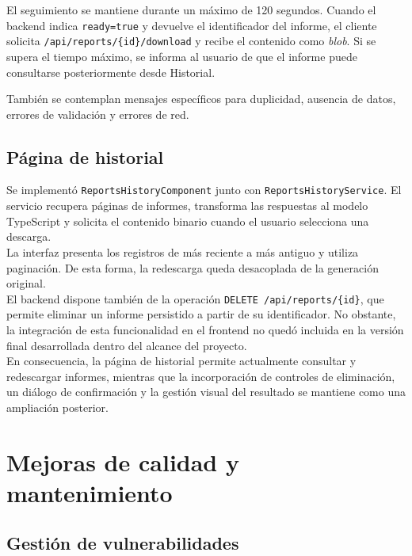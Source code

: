 \documentclass[11pt,a4paper,titlepage,oneside]{report}
\begin{document}
El seguimiento se mantiene durante un máximo de 120 segundos. Cuando el backend
indica \texttt{ready=true} y devuelve el identificador del informe, el cliente
solicita \texttt{/api/reports/\{id\}/download} y recibe el contenido como
\textit{blob}. Si se supera el tiempo máximo, se informa al usuario de que el
informe puede consultarse posteriormente desde Historial.

También se contemplan mensajes específicos para duplicidad, ausencia de datos,
errores de validación y errores de red.

\subsection{Página de historial}

Se implementó \texttt{ReportsHistoryComponent} junto con
\texttt{ReportsHistoryService}. El servicio recupera páginas de informes,
transforma las respuestas al modelo TypeScript y solicita el contenido binario
cuando el usuario selecciona una descarga. \\

La interfaz presenta los registros de más reciente a más antiguo y utiliza
paginación. De esta forma, la redescarga queda desacoplada de la generación
original. \\

El backend dispone también de la operación
\texttt{DELETE /api/reports/\{id\}}, que permite eliminar un informe
persistido a partir de su identificador. No obstante, la integración de esta
funcionalidad en el frontend no quedó incluida en la versión final
desarrollada dentro del alcance del proyecto. \\

En consecuencia, la página de historial permite actualmente consultar y
redescargar informes, mientras que la incorporación de controles de
eliminación, un diálogo de confirmación y la gestión visual del resultado se
mantiene como una ampliación posterior. \\

\section{Mejoras de calidad y mantenimiento}

\subsection{Gestión de vulnerabilidades}
\end{document}

